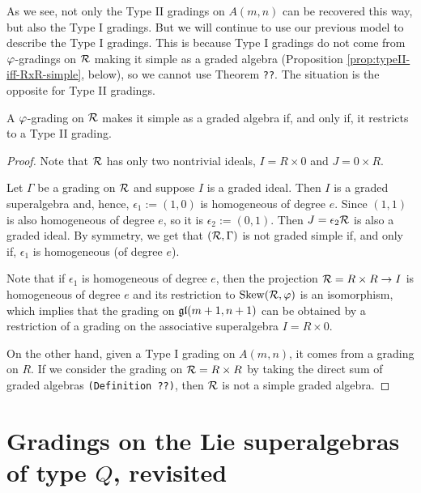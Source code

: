 As we see, not only the Type II gradings on $A(m,n)$ can be recovered this way, but also the Type I gradings. But we will continue to use our previous model to describe the Type I gradings. This is because Type I gradings do not come from $\varphi$-gradings on $\mathcal R$ making it simple as a graded algebra (Proposition \ref{prop:typeII-iff-RxR-simple}, below), so we cannot use Theorem {\tt ??}. The situation is the opposite for Type II gradings.

\begin{prop}\label{prop:typeII-iff-RxR-simple}
	A $\varphi$-grading on $\mathcal R$ makes it simple as a graded algebra if, and only if, it restricts to a Type II grading.
\end{prop}

\begin{proof}
	Note that $\mathcal R$ has only two nontrivial ideals, $I = R\times 0$ and $J = 0\times R$.

	Let $\Gamma$ be a grading on $\mathcal R$ and suppose $I$ is a graded ideal. Then $I$ is a graded superalgebra and, hence, $\epsilon_1 := (1,0)$ is homogeneous of degree $e$. Since $(1,1)$ is also homogeneous of degree $e$, so it is $\epsilon_2:= (0,1)$. Then $J = \epsilon_2 \mathcal R$ is also a graded ideal. By symmetry, we get that $(\mathcal R, \Gamma)$ is not graded simple if, and only if, $\epsilon_1$ is homogeneous (of degree $e$).

	Note that if $\epsilon_1$ is homogeneous of degree $e$, then the projection $\mathcal R = R\times R \to I$ is homogeneous of degree $e$ and its restriction to $\operatorname{Skew}(\mathcal R, \varphi)$ is an isomorphism, which implies that the grading on $\mathfrak{gl}(m +1, n+1)$ can be obtained by a restriction of a grading on the associative superalgebra $I = R\times 0$.

	On the other hand, given a Type I grading on $A(m,n)$, it comes from a grading on $R$. If we consider the grading on $\mathcal R = R\times R$ by taking the direct sum of graded algebras {\tt (Definition ??)}, then $\mathcal R$ is not a simple graded algebra.
\end{proof}

\section{Gradings on the Lie superalgebras of type $Q$, revisited}

